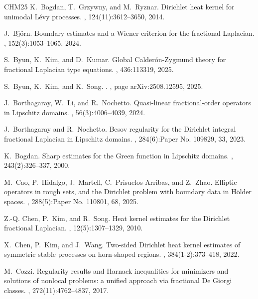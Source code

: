 \documentclass[11pt]{amsart}
\theoremstyle{plain}
\theoremstyle{definition}
\numberwithin{equation}{section}
\begin{document}
\begin{thebibliography}{CHM{\etalchar{+}}25}
K.~Bogdan, T.~Grzywny, and M.~Ryznar.
\newblock Dirichlet heat kernel for unimodal {L}\'evy processes.
, 124(11):3612--3650, 2014.

J.~Bj{\"o}rn.
\newblock Boundary estimates and a {W}iener criterion for the fractional
  {L}aplacian.
, 152(3):1053--1065, 2024.

S.~Byun, K.~Kim, and D.~Kumar.
\newblock Global {C}alder{\'o}n-{Z}ygmund theory for fractional {L}aplacian
  type equations.
, 436:113319, 2025.

S.~{Byun}, K.~{Kim}, and K.~{Song}.
.
, page arXiv:2508.12595, 2025.

J.~Borthagaray, W.~Li, and R.~Nochetto.
\newblock Quasi-linear fractional-order operators in {L}ipschitz domains.
, 56(3):4006--4039, 2024.

J.~Borthagaray and R.~Nochetto.
\newblock Besov regularity for the {D}irichlet integral fractional {L}aplacian
  in {L}ipschitz domains.
, 284(6):Paper No. 109829, 33, 2023.

K.~Bogdan.
\newblock Sharp estimates for the {G}reen function in {L}ipschitz domains.
, 243(2):326--337, 2000.

M.~Cao, P.~Hidalgo, J.~Martell, C.~Prisuelos-Arribas, and Z.~Zhao.
\newblock Elliptic operators in rough sets, and the {Dirichlet} problem with
  boundary data in {H{\"o}lder} spaces.
, 288(5):Paper No. 110801, 68, 2025.

Z.-Q. Chen, P.~Kim, and R.~Song.
\newblock Heat kernel estimates for the {D}irichlet fractional {L}aplacian.
, 12(5):1307--1329, 2010.

X.~Chen, P.~Kim, and J.~Wang.
\newblock Two-sided {D}irichlet heat kernel estimates of symmetric stable
  processes on horn-shaped regions.
, 384(1-2):373--418, 2022.

M.~Cozzi.
\newblock Regularity results and {H}arnack inequalities for minimizers and
  solutions of nonlocal problems: a unified approach via fractional {D}e
  {G}iorgi classes.
, 272(11):4762--4837, 2017.


\end{thebibliography}
\end{document}
